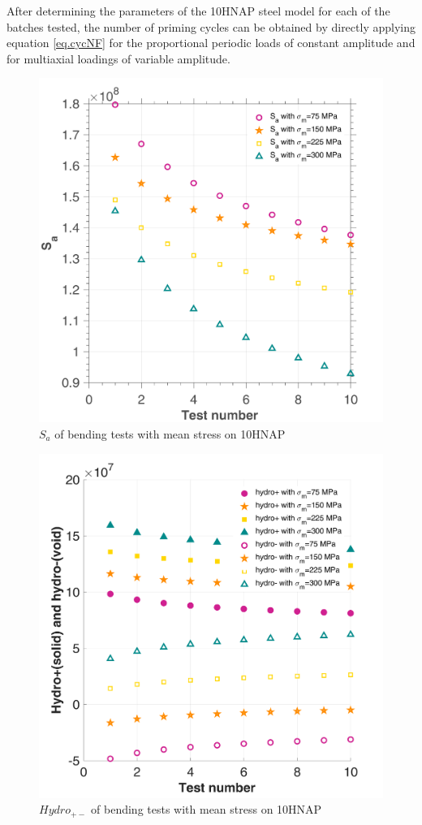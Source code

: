 After determining the parameters of the 10HNAP steel model for each of the batches tested, the number of priming cycles can be obtained by directly applying equation \eqref{eq.cycNF} for the proportional periodic loads of constant amplitude and for multiaxial loadings of variable amplitude.
\begin{figure}[!h]
	\centering
	\includegraphics[width=\textwidth]{figures//10HNAP_b1D_m_Smax.png} 
	\caption{$S_{a}$ of bending tests with mean stress on 10HNAP}
	\label{fig.10HNAPSmax}
\end{figure}
\begin{figure}[!h]
	\centering
	\includegraphics[width=\textwidth]{figures//10HNAP_b1D_m_hydro.png} 
	\caption{$Hydro_{+-}$ of bending tests with mean stress on 10HNAP}
	\label{fig.10HNAPhydro}
\end{figure}

